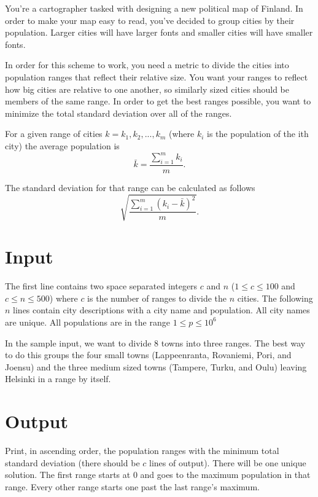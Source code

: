 
You're a cartographer tasked with designing a new political map of Finland. In order 
to make your map easy to read, you've decided to group cities by their population.
Larger cities will have larger fonts and smaller cities will have smaller fonts.

In order for this scheme to work, you need a metric to divide the cities into population
ranges that reflect their relative size. You want your ranges to reflect how big cities
are relative to one another, so similarly sized cities should be members of the
same range. In order to get the best ranges possible, you want to minimize the total
standard deviation over all of the ranges.

For a given range of cities \(k = k_1, k_2, ..., k_m\) (where \(k_i\) is the population
of the ith city) the average population is \[\bar{k} = \frac{\sum_{i = 1}^m k_i}{m}.\]

The standard deviation for that range can be calculated as follows
\[\sqrt{\frac{\sum_{i = 1}^m (k_i - \bar{k})^2}{m}}.\]
\section*{Input}
The first line contains two space separated integers \(c\) and \(n\) (\(1 \leq
c \leq 100\) and \(c \leq n \leq 500\)) where \(c\) is the number of ranges to divide
the \(n\) cities. The following \(n\) lines contain city descriptions with a city name
and population. All city names are unique. All populations are in the range \(1 \leq p
\leq 10^6\)

In the sample input, we want to divide 8 towns into three ranges. The best way to
do this groups the four small towns (Lappeenranta, Rovaniemi, Pori, and Joensu) and
the three medium sized towns (Tampere, Turku, and Oulu) leaving Helsinki in a range
by itself.

\section*{Output}
Print, in ascending order, the population ranges with the minimum total standard deviation
(there should be \(c\) lines of output). 
There will be one unique solution. The first range starts at \(0\) and goes to
the maximum population in that range. Every other range starts one past the last
range's maximum.
